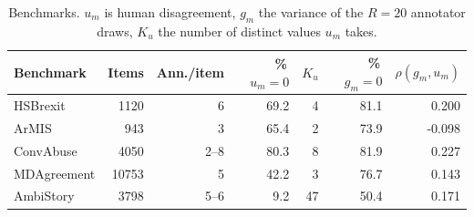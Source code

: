 \begin{table}[t]
\centering
\small
\begin{tabular}{lrrrrrr}
\hline
Benchmark & Items & Ann./item & \%\,$u_m{=}0$ & $K_u$ & \%\,$g_m{=}0$ & $\rho(g_m,u_m)$ \\
\hline
HSBrexit & 1120 & 6 & 69.2 & 4 & 81.1 & 0.200 \\
ArMIS & 943 & 3 & 65.4 & 2 & 73.9 & -0.098 \\
ConvAbuse & 4050 & 2--8 & 80.3 & 8 & 81.9 & 0.227 \\
MDAgreement & 10753 & 5 & 42.2 & 3 & 76.7 & 0.143 \\
AmbiStory & 3798 & 5--6 & 9.2 & 47 & 50.4 & 0.171 \\
\hline
\end{tabular}
\caption{Benchmarks. $u_m$ is human disagreement, $g_m$ the variance of the $R=20$ annotator draws, $K_u$ the number of distinct values $u_m$ takes.}
\label{tab:data}
\end{table}